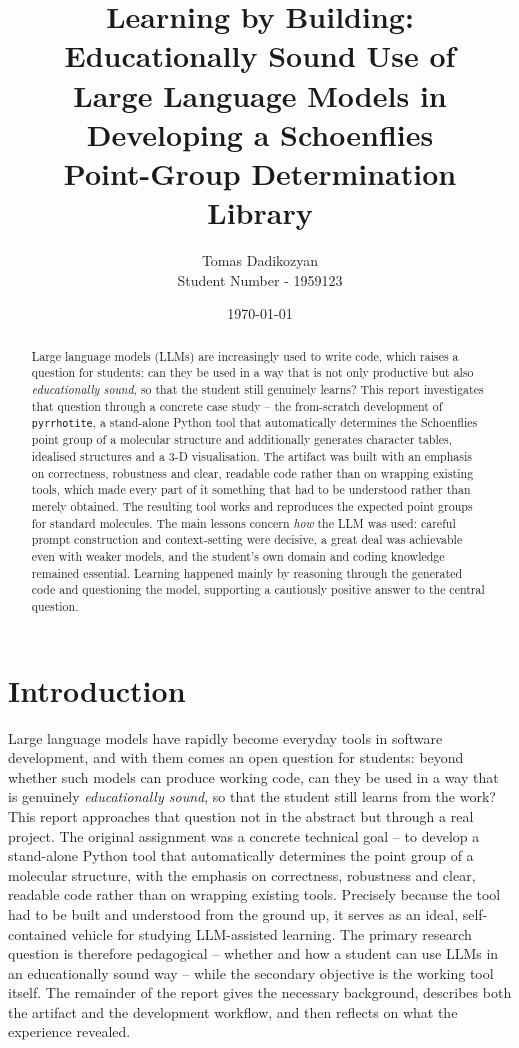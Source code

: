 \documentclass[11pt, a4paper]{article}
\title{Learning by Building: Educationally Sound Use of\\ Large Language Models in Developing a Schoenflies\\ Point-Group Determination Library}
\author{Tomas Dadikozyan\\
Student Number - 1959123}
\date{\today}
\begin{document}
\raggedbottom

\maketitle

\begin{abstract}
Large language models (LLMs) are increasingly used to write code, which raises a
question for students: can they be used in a way that is not only productive but
also \emph{educationally sound}, so that the student still genuinely learns? This
report investigates that question through a concrete case study -- the from-scratch
development of \texttt{pyrrhotite}, a stand-alone Python tool that automatically
determines the Schoenflies point group of a molecular structure and additionally
generates character tables, idealised structures and a 3-D visualisation. The
artifact was built with an emphasis on correctness, robustness and clear, readable
code rather than on wrapping existing tools, which made every part of it something
that had to be understood rather than merely obtained. The resulting tool works and
reproduces the expected point groups for standard molecules. The main lessons concern
\emph{how} the LLM was used: careful prompt construction and context-setting were
decisive, a great deal was achievable even with weaker models, and the student's own
domain and coding knowledge remained essential. Learning happened mainly by reasoning
through the generated code and questioning the model, supporting a cautiously positive
answer to the central question.
\end{abstract}

\newpage
\tableofcontents
\newpage

\section{Introduction}
Large language models have rapidly become everyday tools in software development, and
with them comes an open question for students: beyond whether such models can produce
working code, can they be used in a way that is genuinely \emph{educationally sound},
so that the student still learns from the work? This report approaches that question
not in the abstract but through a real project. The original assignment was a concrete
technical goal -- to develop a stand-alone Python tool that automatically determines
the point group of a molecular structure, with the emphasis on correctness, robustness
and clear, readable code rather than on wrapping existing tools. Precisely because the
tool had to be built and understood from the ground up, it serves as an ideal,
self-contained vehicle for studying LLM-assisted learning. The primary research
question is therefore pedagogical -- whether and how a student can use LLMs in an
educationally sound way -- while the secondary objective is the working tool itself.
The remainder of the report gives the necessary background, describes both the artifact
and the development workflow, and then reflects on what the experience revealed.
\end{document}
